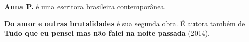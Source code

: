 \textbf{Anna P.} é uma escritora brasileira contemporânea.

\textbf{Do amor e outras brutalidades} é sua segunda obra. É autora também de \textbf{Tudo que eu pensei mas não falei na noite passada} (2014). 
